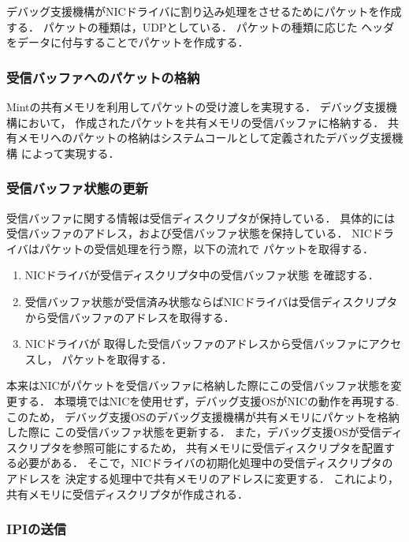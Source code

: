 \documentclass[submit,techreq,noauthor,dvipdfmx]{ipsj}
\begin{document}
デバッグ支援機構がNICドライバに割り込み処理をさせるためにパケットを作成する．
パケットの種類は，UDPとしている．
パケットの種類に応じた
ヘッダをデータに付与することでパケットを作成する．

\subsubsection{受信バッファへのパケットの格納}\label{sec:store_packet_to_recieving_buffer}

Mintの共有メモリを利用してパケットの受け渡しを実現する．
デバッグ支援機構において，
作成されたパケットを共有メモリの受信バッファに格納する．
共有メモリへのパケットの格納はシステムコールとして定義されたデバッグ支援機構
によって実現する．

\subsubsection{受信バッファ状態の更新}\label{sec:renew_recieving_descripter}

受信バッファに関する情報は受信ディスクリプタが保持している．
具体的には受信バッファのアドレス，および受信バッファ状態を保持している．
NICドライバはパケットの受信処理を行う際，以下の流れで
パケットを取得する．

\begin{enumerate}
    \item 
        NICドライバが受信ディスクリプタ中の受信バッファ状態
        を確認する．
    \item
        受信バッファ状態が受信済み状態ならばNICドライバは受信ディスクリプタ
        から受信バッファのアドレスを取得する．
    \item
        NICドライバが
        取得した受信バッファのアドレスから受信バッファにアクセスし，
        パケットを取得する．
\end{enumerate}
本来はNICがパケットを受信バッファに格納した際にこの受信バッファ状態を変更する．
本環境ではNICを使用せず，デバッグ支援OSがNICの動作を再現する.
このため，
デバッグ支援OSのデバッグ支援機構が共有メモリにパケットを格納した際に
この受信バッファ状態を更新する．
また，デバッグ支援OSが受信ディスクリプタを参照可能にするため，
共有メモリに受信ディスクリプタを配置する必要がある．
そこで，NICドライバの初期化処理中の受信ディスクリプタのアドレスを
決定する処理中で共有メモリのアドレスに変更する．
これにより，共有メモリに受信ディスクリプタが作成される．

\subsubsection{IPIの送信}\label{sec:send_IPI}
\end{document}
